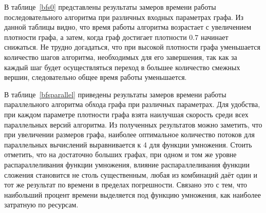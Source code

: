В таблице~\ref{bfs0} представлены результаты замеров времени работы последовательного алгоритма при различных входных параметрах графа. Из данной таблицы видно, что время работы алгоритма возрастает с увеличением плотности графа, а затем, когда граф достигает плотности $0.7$ начинает снижаться. Не трудно догадаться, что при высокой плотности графа уменьшается количество шагов алгоритма, необходимых для его завершения, так как за каждый шаг будет осуществляться переход в большее количество смежных вершин, следовательно общее время работы уменьшается.

\begin{table}[h]
\centering
    \caption{Производительность последовательного алгоритма обхода графов в ширину.}
    \label{bfs0}
\end{table}

В таблице~\ref{bfsparallel} приведены результаты замеров времени работы параллельного алгоритма обхода графа при различных параметрах. Для удобства, при каждом параметре плотности графа взята наилучшая скорость среди всех параллельных версий алгоритма. Из полученных результатов можно заметить, что при увеличении размеров графа, наиболее оптимальное количество потоков для параллельных вычислений выравнивается к 4 для функции умножения. Стоить отметить, что на достаточно больших графах, при одном и том же уровне распараллеливания функции умножения, влияние распараллеливания функции сложения становится не столь существенным, любая из комбинаций даёт один и тот же результат по времени в пределах погрешности. Связано это с тем, что наибольший процент времени выделяется под функцию умножения, как наиболее затратную по ресурсам.

